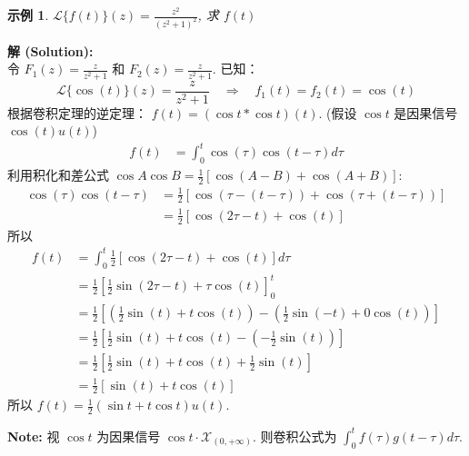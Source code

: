 \documentclass[linespread=1.5,openany]{book}%
\def\diff{d}%
\theoremstyle{plain}
\newtheorem{example}[theorem]{示例}
\newcommand{\diff}{\mathop{}\!\mathrm{d}}  %
\begin{document}
{{{{{{								\begin{example}$\mathcal{L}\{f(t)\}(z) = \frac{z^2}{(z^2+1)^2}$, 求 $f(t)$ \label{ex:L15_conv_thm_inv2}
								\end{example}
								\noindent\textbf{解 (Solution):} \\
								令 $F_1(z) = \frac{z}{z^2+1}$ 和 $F_2(z) = \frac{z}{z^2+1}$.
								已知：
								\[ \mathcal{L}\{\cos(t)\}(z) = \frac{z}{z^2+1} \quad \Rightarrow \quad f_1(t) = f_2(t) = \cos(t) \]
								根据卷积定理的逆定理：
								$f(t) = (\cos t * \cos t)(t)$. (假设 $\cos t$ 是因果信号 $\cos(t)u(t)$)
								\begin{align*}
									f(t) &= \int_{0}^{t} \cos(\tau)\cos(t-\tau) \diff \tau
								\end{align*}
								利用积化和差公式 $\cos A \cos B = \frac{1}{2}[\cos(A-B) + \cos(A+B)]$:
								\begin{align*}
									\cos(\tau)\cos(t-\tau) &= \frac{1}{2}[\cos(\tau - (t-\tau)) + \cos(\tau + (t-\tau))] \\
									&= \frac{1}{2}[\cos(2\tau - t) + \cos(t)]
								\end{align*}
								所以
								\begin{align*}
									f(t) &= \int_{0}^{t} \frac{1}{2}[\cos(2\tau - t) + \cos(t)] \diff \tau \\
									&= \frac{1}{2} \left[ \frac{1}{2}\sin(2\tau - t) + \tau\cos(t) \right]_{0}^{t} \\
									&= \frac{1}{2} \left[ \left(\frac{1}{2}\sin(t) + t\cos(t)\right) - \left(\frac{1}{2}\sin(-t) + 0\cos(t)\right) \right] \\
									&= \frac{1}{2} \left[ \frac{1}{2}\sin(t) + t\cos(t) - \left(-\frac{1}{2}\sin(t)\right) \right] \\
									&= \frac{1}{2} \left[ \frac{1}{2}\sin(t) + t\cos(t) + \frac{1}{2}\sin(t) \right] \\
									&= \frac{1}{2} [\sin(t) + t\cos(t)]
								\end{align*}
								所以 $f(t) = \frac{1}{2}(\sin t + t\cos t)u(t)$.
								
								\textbf{Note:} 视 $\cos t$ 为因果信号 $\cos t \cdot \mathcal{X}_{(0,+\infty)}$. 则卷积公式为 $\int_0^t f(\tau)g(t-\tau)d\tau$.
								
}}}}}}
\end{document}
